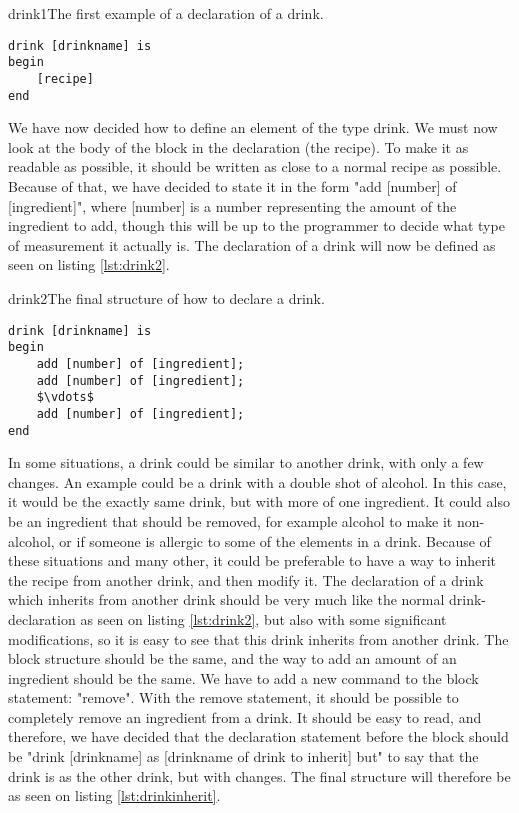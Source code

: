 \begin{code}{drink1}{The first example of a declaration of a drink.}
\begin{lstlisting}
drink [drinkname] is
begin
	[recipe]
end
\end{lstlisting}
\end{code}

We have now decided how to define an element of the type drink. We must now look at the body of the block in the declaration (the recipe). To make it as readable as possible, it should be written as close to a normal recipe as possible. Because of that, we have decided to state it in the form "add [number] of [ingredient]", where [number] is a number representing the amount of the ingredient to add, though this will be up to the programmer to decide what type of measurement it actually is. The declaration of a drink will now be defined as seen on listing \ref{lst:drink2}.

\begin{code}{drink2}{The final structure of how to declare a drink.}
\begin{lstlisting}[mathescape]
drink [drinkname] is
begin
	add [number] of [ingredient];
	add [number] of [ingredient];
	$\vdots$
	add [number] of [ingredient];
end
\end{lstlisting}
\end{code}

In some situations, a drink could be similar to another drink, with only a few changes. An example could be a drink with a double shot of alcohol. In this case, it would be the exactly same drink, but with more of one ingredient. It could also be an ingredient that should be removed, for example alcohol to make it non-alcohol, or if someone is allergic to some of the elements in a drink. Because of these situations and many other, it could be preferable to have a way to inherit the recipe from another drink, and then modify it. The declaration of a drink which inherits from another drink should be very much like the normal drink-declaration as seen on listing \ref{lst:drink2}, but also with some significant modifications, so it is easy to see that this drink inherits from another drink. The block structure should be the same, and the way to add an amount of an ingredient should be the same. We have to add a new command to the block statement: "remove". With the remove statement, it should be possible to completely remove an ingredient from a drink. It should be easy to read, and therefore, we have decided that the declaration statement before the block should be "drink [drinkname] as [drinkname of drink to inherit] but" to say that the drink is as the other drink, but with changes. The final structure will therefore be as seen on listing \ref{lst:drinkinherit}.

